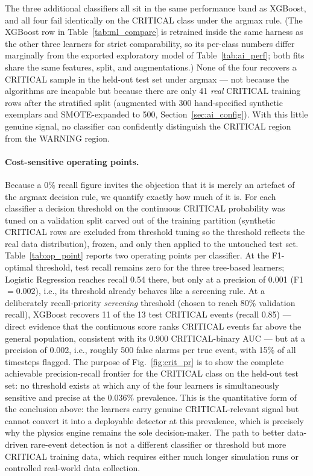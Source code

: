 \documentclass[sn-mathphys-num,Numbered,iicol]{sn-jnl}
\begin{document}
The three additional classifiers all sit in the same performance band as XGBoost, and all four fail identically on the CRITICAL class under the argmax rule. (The XGBoost row in Table~\ref{tab:ml_compare} is retrained inside the same harness as the other three learners for strict comparability, so its per-class numbers differ marginally from the exported exploratory model of Table~\ref{tab:ai_perf}; both fits share the same features, split, and augmentations.) None of the four recovers a CRITICAL sample in the held-out test set under argmax --- not because the algorithms are incapable but because there are only 41 \emph{real} CRITICAL training rows after the stratified split (augmented with 300 hand-specified synthetic exemplars and SMOTE-expanded to 500, Section~\ref{sec:ai_config}). With this little genuine signal, no classifier can confidently distinguish the CRITICAL region from the WARNING region.

\paragraph{Cost-sensitive operating points.}
Because a 0\% recall figure invites the objection that it is merely an artefact of the argmax decision rule, we quantify exactly how much of it is. For each classifier a decision threshold on the continuous CRITICAL probability was tuned on a validation split carved out of the training partition (synthetic CRITICAL rows are excluded from threshold tuning so the threshold reflects the real data distribution), frozen, and only then applied to the untouched test set. Table~\ref{tab:op_point} reports two operating points per classifier. At the F1-optimal threshold, test recall remains zero for the three tree-based learners; Logistic Regression reaches recall 0.54 there, but only at a precision of 0.001 (F1 $= 0.002$), i.e., its threshold already behaves like a screening rule. At a deliberately recall-priority \emph{screening} threshold (chosen to reach 80\% validation recall), XGBoost recovers 11 of the 13 test CRITICAL events (recall 0.85) --- direct evidence that the continuous score ranks CRITICAL events far above the general population, consistent with its 0.900 CRITICAL-binary AUC --- but at a precision of 0.002, i.e., roughly 500 false alarms per true event, with 15\% of all timesteps flagged. The purpose of Fig.~\ref{fig:crit_pr} is to show the complete achievable precision-recall frontier for the CRITICAL class on the held-out test set: no threshold exists at which any of the four learners is simultaneously sensitive and precise at the 0.036\% prevalence. This is the quantitative form of the conclusion above: the learners carry genuine CRITICAL-relevant signal but cannot convert it into a deployable detector at this prevalence, which is precisely why the physics engine remains the sole decision-maker. The path to better data-driven rare-event detection is not a different classifier or threshold but more CRITICAL training data, which requires either much longer simulation runs or controlled real-world data collection.
\end{document}
